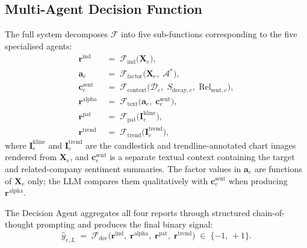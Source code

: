 \subsection{Multi-Agent Decision Function}

The full system decomposes $\mathcal{F}$ into five
sub-functions corresponding to the five specialised agents:
\begin{align}
    \mathbf{r}^{\mathrm{ind}}
    &\;=\; \mathcal{F}_{\mathrm{ind}}\!\bigl(\mathbf{X}_e\bigr),
    \label{eq:ind} \\
    \mathbf{a}_e
    &\;=\; \mathcal{F}_{\mathrm{factor}}\!\bigl(
            \mathbf{X}_e,\; \mathcal{A}^{*}
           \bigr),
    \label{eq:alpha_factor} \\
    \mathbf{c}^{\mathrm{sent}}_e
    &\;=\; \mathcal{F}_{\mathrm{context}}\!\bigl(
            \mathcal{D}_e,\;
            S_{\mathrm{decay},e},\;
            \mathrm{Rel}_{\mathrm{sent},e}
           \bigr),
    \label{eq:sent_context} \\
    \mathbf{r}^{\mathrm{alpha}}
    &\;=\; \mathcal{F}_{\mathrm{text}}\!\bigl(
            \mathbf{a}_e,\; \mathbf{c}^{\mathrm{sent}}_e
           \bigr),
    \label{eq:alpha} \\
    \mathbf{r}^{\mathrm{pat}}
    &\;=\; \mathcal{F}_{\mathrm{pat}}\!\bigl(
            \mathbf{I}^{\mathrm{kline}}_e
           \bigr),
    \label{eq:pat} \\
    \mathbf{r}^{\mathrm{trend}}
    &\;=\; \mathcal{F}_{\mathrm{trend}}\!\bigl(
            \mathbf{I}^{\mathrm{trend}}_e
           \bigr),
    \label{eq:trend}
\end{align}
where $\mathbf{I}^{\mathrm{kline}}_e$ and
$\mathbf{I}^{\mathrm{trend}}_e$ are the candlestick and
trendline-annotated chart images rendered from $\mathbf{X}_e$, and
$\mathbf{c}^{\mathrm{sent}}_e$ is a separate textual context containing the
target and related-company sentiment summaries. The factor values in
$\mathbf{a}_e$ are functions of $\mathbf{X}_e$ only; the LLM compares
them qualitatively with $\mathbf{c}^{\mathrm{sent}}_e$ when producing
$\mathbf{r}^{\mathrm{alpha}}$.

The Decision Agent aggregates all four reports through structured
chain-of-thought prompting \cite{wei2022chain} and produces the final binary signal:
\begin{equation}
    \hat{y}_{e,L} \;=\; \mathcal{F}_{\mathrm{dec}}\!\bigl(
        \mathbf{r}^{\mathrm{ind}},\;
        \mathbf{r}^{\mathrm{alpha}},\;
        \mathbf{r}^{\mathrm{pat}},\;
        \mathbf{r}^{\mathrm{trend}}
    \bigr) \;\in\; \{-1,\, +1\}.
    \label{eq:decision}
\end{equation}


